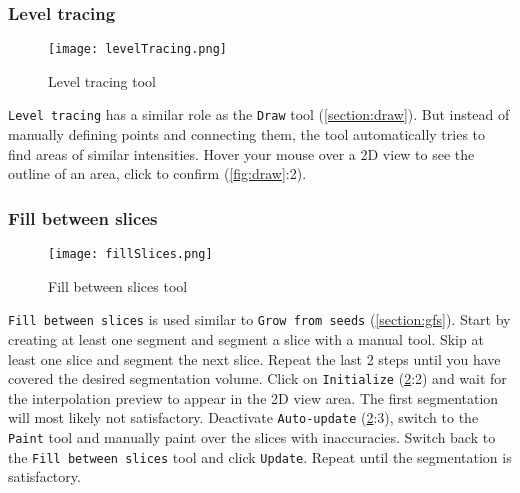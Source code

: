 \pagebreak
\subsubsection{Level tracing}
\begin{figure}[h]
	\begin{subfigure}{0.2\textwidth}
		
	\end{subfigure}
\end{figure}

\begin{figure}[h!]
	\centerline{
		\texttt{[image: levelTracing.png]}}
	\caption{Level tracing tool}\label{fig:lT}
\end{figure}
\noindent
\texttt{Level tracing} has a similar role as the \texttt{Draw} tool (\cref{section:draw}).
But instead of manually defining points and connecting them, the tool automatically tries to find areas of similar intensities.
Hover your mouse over a 2D view to see the outline of an area, click to confirm (\cref{fig:draw}:2).

\pagebreak
\subsubsection{Fill between slices}
\begin{figure}[h]
	\begin{subfigure}{0.2\textwidth}
		
	\end{subfigure}
	\begin{subfigure}{0.2\textwidth}
		
	\end{subfigure}
\end{figure}

\begin{figure}[h!]
	\centerline{
		\texttt{[image: fillSlices.png]}}
	\caption{Fill between slices tool}\label{fig:fS}
\end{figure}
\noindent
\texttt{Fill between slices} is used similar to \texttt{Grow from seeds} (\cref{section:gfs}).
Start by creating at least one segment and segment a slice with a manual tool.
Skip at least one slice and segment the next slice.
Repeat the last 2 steps until you have covered the desired segmentation volume.
Click on \texttt{Initialize} (\cref{fig:fS}:2) and wait for the interpolation preview to appear in the 2D view area.
The first segmentation will most likely not satisfactory.
Deactivate \texttt{Auto-update} (\cref{fig:fS}:3), switch to the \texttt{Paint} tool and manually paint over the slices with inaccuracies.
Switch back to the \texttt{Fill between slices} tool and click \texttt{Update}.
Repeat until the segmentation is satisfactory.

